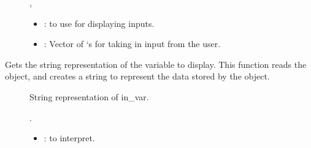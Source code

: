 \documentclass[letterpaper,10pt,english]{sphinxmanual}
\begin{document}
\begin{fulllineitems}
\begin{fulllineitems}
\begin{description}
\item[{}] \leavevmode
{\hyperref[\detokenize{index:Pessumclassostendo_1_1Window}]{}}, {\hyperref[\detokenize{index:Pessumstructostendo_1_1Var}]{}} 

\item[{}] \leavevmode\begin{itemize}
\item {} 
: {\hyperref[\detokenize{index:Pessumclassostendo_1_1Window}]{}} to use for displaying inputs. 

\item {} 
: Vector of {\hyperref[\detokenize{index:Pessumstructostendo_1_1Var}]{}}`s for taking in input from the user. 

\end{itemize}

\end{description}


\end{fulllineitems}


\begin{fulllineitems}
\label{\detokenize{index:_CPPv2N7ostendo9GetVarStrE3Vari}}%
\pysigstartmultiline
{}\label{\detokenize{index:Pessumnamespaceostendo_1a75491bb403d248c50aafc1f5eb310d75}}%
\pysigstopmultiline
Gets the string representation of the variable to display. This function reads the {\hyperref[\detokenize{index:Pessumstructostendo_1_1Var}]{}} object, and creates a string to represent the data stored by the object. \begin{description}
\item[{}] \leavevmode
String representation of in\_var. 

\item[{}] \leavevmode
{\hyperref[\detokenize{index:Pessumstructostendo_1_1Var}]{}}. 

\item[{}] \leavevmode\begin{itemize}
\item {} 
: {\hyperref[\detokenize{index:Pessumstructostendo_1_1Var}]{}} to interpret. 


\end{itemize}
\end{description}
\end{fulllineitems}
\end{fulllineitems}
\end{document}
